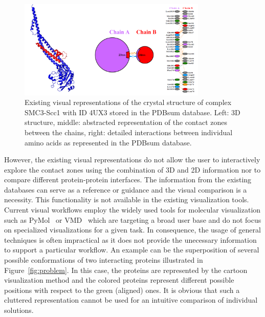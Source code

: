 \documentclass[11pt,a4paper,titlepage,oneside,onecolumn]{article}
\begin{document}
\begin{figure}[h]
  \centering
  \includegraphics[width=0.8\textwidth]{pics/pdbsum3.png}
  \caption{Existing visual representations of the crystal structure of complex SMC3-Scc1 with ID 4UX3 stored in the PDBsum database. Left: 3D structure, middle: abstracted representation of the contact zones between the chains, right: detailed interactions between individual amino acids as represented in the PDBsum database.}
  \label{fig:pdbsum}
\end{figure}

However, the existing visual representations do not allow the user to interactively explore the contact zones using the combination of 3D and 2D information nor to compare different protein-protein interfaces.
The information from the existing databases can serve as a reference or guidance and the visual comparison is a necessity.
This functionality is not available in the existing visualization tools.
Current visual workflows employ the widely used tools for molecular visualization such as PyMol~\cite{pymol} or VMD~\cite{VMD} which are targeting a broad user base and do not focus on specialized visualizations for a given task.
In consequence, the usage of general techniques is often impractical as it does not  provide the unecessary information to support a particular workflow.
An example can be the superposition of several possible conformations of two interacting proteins illustrated in Figure~\ref{fig:problem}.
In this case, the proteins are represented by the cartoon visualization method and the colored proteins represent different possible positions with respect to the green (aligned) ones.
It is obvious that such a cluttered representation cannot be used for an intuitive comparison of individual solutions.
\end{document}
